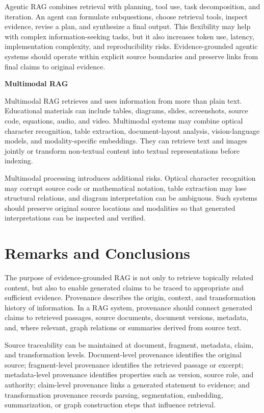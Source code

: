 \documentclass[12pt,a4paper]{report}
\numberwithin{equation}{chapter}
\begin{document}
Agentic RAG combines retrieval with planning, tool use, task decomposition, and iteration. An agent can formulate subquestions, choose retrieval tools, inspect evidence, revise a plan, and synthesize a final output. This flexibility may help with complex information-seeking tasks, but it also increases token use, latency, implementation complexity, and reproducibility risks. Evidence-grounded agentic systems should operate within explicit source boundaries and preserve links from final claims to original evidence.
\par\medskip
\textbf{Multimodal RAG}

Multimodal RAG retrieves and uses information from more than plain text. Educational materials can include tables, diagrams, slides, screenshots, source code, equations, audio, and video. Multimodal systems may combine optical character recognition, table extraction, document-layout analysis, vision-language models, and modality-specific embeddings. They can retrieve text and images jointly or transform non-textual content into textual representations before indexing.

Multimodal processing introduces additional risks. Optical character recognition may corrupt source code or mathematical notation, table extraction may lose structural relations, and diagram interpretation can be ambiguous. Such systems should preserve original source locations and modalities so that generated interpretations can be inspected and verified.

\section{Remarks and Conclusions}

The purpose of evidence-grounded RAG is not only to retrieve topically related content, but also to enable generated claims to be traced to appropriate and sufficient evidence. Provenance describes the origin, context, and transformation history of information. In a RAG system, provenance should connect generated claims to retrieved passages, source documents, document versions, metadata, and, where relevant, graph relations or summaries derived from source text.

Source traceability can be maintained at document, fragment, metadata, claim, and transformation levels. Document-level provenance identifies the original source; fragment-level provenance identifies the retrieved passage or excerpt; metadata-level provenance identifies properties such as version, source role, and authority; claim-level provenance links a generated statement to evidence; and transformation provenance records parsing, segmentation, embedding, summarization, or graph construction steps that influence retrieval.
\end{document}
